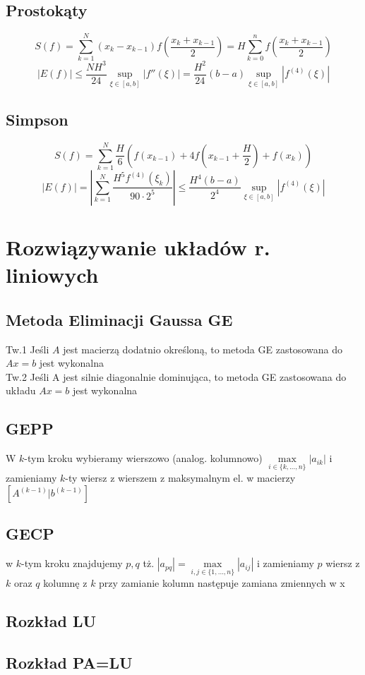 \documentclass[10pt,twocolumn]{article}
\begin{document}
\begin{flushleft}
\subsection{Prostokąty}
$$S(f) = \sum_{k=1}^{N}(x_k-x_{k-1})f\left(\frac{x_k+x_{k-1}}{2}\right) = H\sum_{k=0}^{n}f(\frac{x_k + x_{k-1}}{2})$$
$$|E(f)| \leq \frac{NH^3}{24}\underset{\xi \in [a,b]}{\sup}|f''(\xi)| = \frac{H^2}{24}(b-a)\underset{\xi \in [a,b]}{\sup}|f^{(4)}(\xi)|$$
\subsection{Simpson}
$$S(f) = \sum_{k=1}^N \frac{H}{6} \left(f(x_{k-1})+4f\left(x_{k-1}+\frac{H}{2}\right)+f(x_k)\right)$$
$$|E(f)|= \left| \sum_{k=1}^N \frac{H^5f^{(4)}(\xi_k)}{90\cdot2^5}\right| \leq \frac{H^4(b-a)}{2^4}\underset{\xi \in [a,b]}{\sup}|f^{(4)}(\xi)| $$

\section{Rozwiązywanie układów r. liniowych}
\subsection{Metoda Eliminacji Gaussa GE}
Tw.1 Jeśli $A$ jest macierzą dodatnio określoną, to metoda GE zastosowana do $Ax=b$ jest wykonalna\\
Tw.2 Jeśli A jest silnie diagonalnie dominująca, to metoda GE zastosowana do układu $Ax=b$ jest wykonalna
\subsection{GEPP}
W $k$-tym kroku wybieramy wierszowo (analog. kolumnowo) $\underset{i \in \{k,...,n\}}{\max}|a_{ik}|$ i zamieniamy $k$-ty wiersz z wierszem z maksymalnym el. w macierzy $[A^{(k-1)}|b^{(k-1)}]$
\subsection{GECP}
w $k$-tym kroku znajdujemy $p,q$ tż. $|a_{pq}| = \underset{i,j \in \{1,...,n\}}{\max}|a_{ij}|$ i zamieniamy $p$ wiersz z $k$ oraz $q$ kolumnę z $k$ przy zamianie kolumn następuje zamiana zmiennych w x
\subsection{Rozkład LU} %
\subsection{Rozkład PA=LU} 

\end{flushleft}
\end{document}
